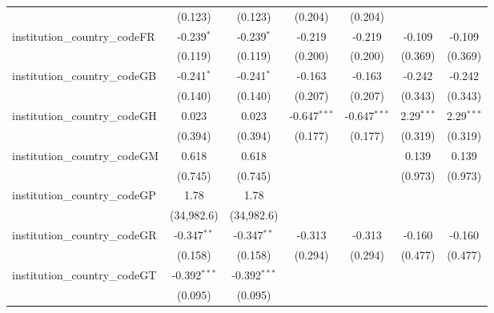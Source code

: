 \begin{tabular}{lcccccc}
                                         & (0.123)        & (0.123)        & (0.204)        & (0.204)        &                &   \\   
   institution\_country\_codeFR          & -0.239$^{*}$   & -0.239$^{*}$   & -0.219         & -0.219         & -0.109         & -0.109\\   
                                         & (0.119)        & (0.119)        & (0.200)        & (0.200)        & (0.369)        & (0.369)\\   
   institution\_country\_codeGB          & -0.241$^{*}$   & -0.241$^{*}$   & -0.163         & -0.163         & -0.242         & -0.242\\   
                                         & (0.140)        & (0.140)        & (0.207)        & (0.207)        & (0.343)        & (0.343)\\   
   institution\_country\_codeGH          & 0.023          & 0.023          & -0.647$^{***}$ & -0.647$^{***}$ & 2.29$^{***}$   & 2.29$^{***}$\\   
                                         & (0.394)        & (0.394)        & (0.177)        & (0.177)        & (0.319)        & (0.319)\\   
   institution\_country\_codeGM          & 0.618          & 0.618          &                &                & 0.139          & 0.139\\   
                                         & (0.745)        & (0.745)        &                &                & (0.973)        & (0.973)\\   
   institution\_country\_codeGP          & 1.78           & 1.78           &                &                &                &   \\   
                                         & (34,982.6)     & (34,982.6)     &                &                &                &   \\   
   institution\_country\_codeGR          & -0.347$^{**}$  & -0.347$^{**}$  & -0.313         & -0.313         & -0.160         & -0.160\\   
                                         & (0.158)        & (0.158)        & (0.294)        & (0.294)        & (0.477)        & (0.477)\\   
   institution\_country\_codeGT          & -0.392$^{***}$ & -0.392$^{***}$ &                &                &                &   \\   
                                         & (0.095)        & (0.095)        &                &                &                &   \\   

\end{tabular}
